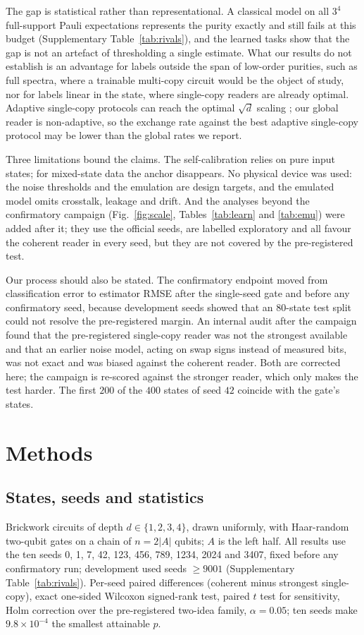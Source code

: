 \documentclass[11pt,a4paper]{article}
\begin{document}
The gap is statistical rather than representational. A classical model on all $3^4$ full-support
Pauli expectations represents the purity exactly and still fails at this budget (Supplementary
Table~\ref{tab:rivals}), and the learned tasks show that the gap is not an artefact of thresholding
a single estimate. What our results do not establish is an advantage for labels outside the span
of low-order purities, such as full spectra, where a trainable multi-copy circuit would be the
object of study, nor for labels linear in the state, where single-copy readers are already optimal.
Adaptive single-copy protocols can reach the optimal $\sqrt d$ scaling \citep{liu2026moments}; our
global reader is non-adaptive, so the exchange rate against the best adaptive single-copy protocol
may be lower than the global rates we report.

Three limitations bound the claims. The self-calibration relies on pure input states; for
mixed-state data the anchor disappears. No physical device was used: the noise thresholds and the
emulation are design targets, and the emulated model omits crosstalk, leakage and drift. And the
analyses beyond the confirmatory campaign (Fig.~\ref{fig:scale}, Tables~\ref{tab:learn} and
\ref{tab:emu}) were added after it; they use the official seeds, are labelled exploratory and all
favour the coherent reader in every seed, but they are not covered by the pre-registered test.

Our process should also be stated. The confirmatory endpoint moved from classification error to
estimator RMSE after the single-seed gate and before any confirmatory seed, because development
seeds showed that an $80$-state test split could not resolve the pre-registered margin. An internal
audit after the campaign found that the pre-registered single-copy reader was not the strongest
available and that an earlier noise model, acting on swap signs instead of measured bits, was not
exact and was biased against the coherent reader. Both are corrected here; the campaign is
re-scored against the stronger reader, which only makes the test harder. The first $200$ of the
$400$ states of seed $42$ coincide with the gate's states.

\section{Methods}

\subsection{States, seeds and statistics}
Brickwork circuits of depth $d\in\{1,2,3,4\}$, drawn uniformly, with Haar-random two-qubit gates on
a chain of $n=2|A|$ qubits; $A$ is the left half. All results use the ten seeds
0, 1, 7, 42, 123, 456, 789, 1234, 2024 and 3407, fixed before any confirmatory run; development used
seeds $\ge9001$ (Supplementary Table~\ref{tab:rivals}). Per-seed paired differences (coherent minus
strongest single-copy), exact one-sided Wilcoxon signed-rank test, paired $t$ test for
sensitivity, Holm correction over the pre-registered two-idea family, $\alpha=0.05$; ten seeds make
$9.8\times10^{-4}$ the smallest attainable $p$.
\end{document}
